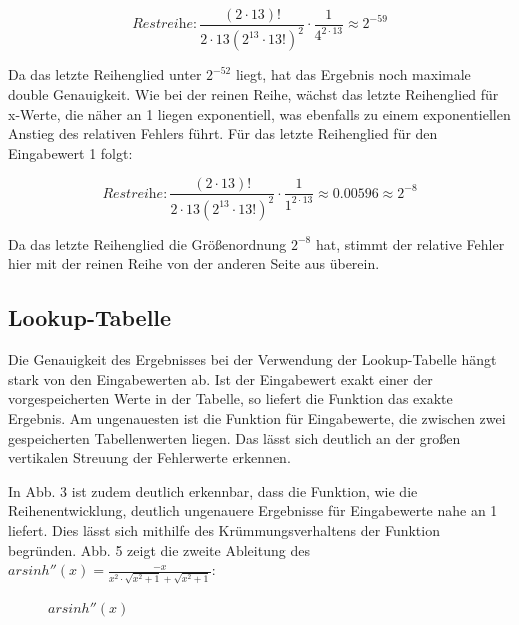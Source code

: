 \documentclass[course=erap] {aspdoc}
\begin{document}
    \[
        \textit{Restreihe}: \frac{(2\cdot13)!}{2\cdot13(2^{13}\cdot 13!)^2} \cdot \frac{1}{4^{2\cdot13}} \approx 2^{-59}
    \]

    Da das letzte Reihenglied unter $2^{-52}$ liegt, hat das Ergebnis noch maximale double Genauigkeit.
    Wie bei der reinen Reihe, wächst das letzte Reihenglied für x-Werte, die näher an 1 liegen exponentiell, was ebenfalls zu einem exponentiellen Anstieg des relativen Fehlers führt.
    Für das letzte Reihenglied für den Eingabewert 1 folgt:

    \[
        \textit{Restreihe}: \frac{(2\cdot13)!}{2\cdot13(2^{13}\cdot 13!)^2} \cdot \frac{1}{1^{2\cdot13}} \approx 0.00596 \approx 2^{-8}
    \]

    Da das letzte Reihenglied die Größenordnung $2^{-8}$ hat, stimmt der relative Fehler hier mit der reinen Reihe von der anderen Seite aus überein.

    \subsection{Lookup-Tabelle}\label{subsec:lookup-tabelle}

    Die Genauigkeit des Ergebnisses bei der Verwendung der Lookup-Tabelle hängt stark von den Eingabewerten ab.
    Ist der Eingabewert exakt einer der vorgespeicherten Werte in der Tabelle, so liefert die Funktion das exakte Ergebnis.
    Am ungenauesten ist die Funktion für Eingabewerte, die zwischen zwei gespeicherten Tabellenwerten liegen.
    Das lässt sich deutlich an der großen vertikalen Streuung der Fehlerwerte erkennen.

    In Abb. 3 ist zudem deutlich erkennbar, dass die Funktion, wie die Reihenentwicklung, deutlich ungenauere Ergebnisse für Eingabewerte nahe an 1 liefert.
    Dies lässt sich mithilfe des Krümmungsverhaltens der Funktion begründen.
    Abb. 5 zeigt die zweite Ableitung des $arsinh''(x) = \frac{-x}{x^2\cdot \sqrt{x^2+1}+\sqrt{x^2+1}}$:
    
    \begin{figure}[h]
        \caption{$arsinh''(x)$}
    \end{figure}
\end{document}
